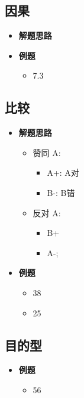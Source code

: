   \subsection{因果}

    \begin{itemize}
      \item \textbf{解题思路}
      \item \textbf{例题}
      \begin{itemize}
        \item 7.3
      \end{itemize}
    \end{itemize}

  \subsection{比较}

    \begin{itemize}
      \item \textbf{解题思路}
      \begin{itemize}
        \item 赞同 A:
        \begin{itemize}
          \item A+: A对
          \item B-: B错
        \end{itemize}

        \item 反对 A:
        \begin{itemize}
          \item B+
          \item A-;
        \end{itemize}
      \end{itemize}

      \item \textbf{例题}
      \begin{itemize}
        \item 38
        \item 25
      \end{itemize}
    \end{itemize}

  \subsection{目的型}

    \begin{itemize}
      \item \textbf{例题}
      \begin{itemize}
        \item 56
      \end{itemize}
    \end{itemize}

